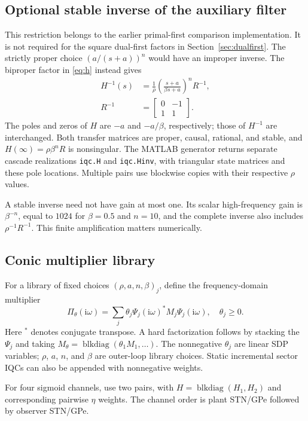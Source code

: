 \documentclass[final,5p,twocolumn]{elsarticle}
\theoremstyle{definition}
\theoremstyle{remark}
\DeclareMathOperator{\blkdiag}{blkdiag}
\begin{document}
\subsection{Optional stable inverse of the auxiliary filter}
This restriction belongs to the earlier primal-first comparison implementation. It is not required for the square dual-first factors in Section~\ref{sec:dualfirst}.
The strictly proper choice $(a/(s+a))^n$ would have an improper inverse. The biproper factor in \eqref{eq:h} instead gives
\begin{align}
 H^{-1}(s)&=\frac{1}{\rho}\left(\frac{s+a}{\beta s+a}\right)^nR^{-1},\label{eq:Hinv}\\
 R^{-1}&=\begin{bmatrix}0&-1\\1&1\end{bmatrix}.
\end{align}
The poles and zeros of $H$ are $-a$ and $-a/\beta$, respectively; those of $H^{-1}$ are interchanged. Both transfer matrices are proper, causal, rational, and stable, and $H(\infty)=\rho\beta^nR$ is nonsingular. The MATLAB generator returns separate cascade realizations \texttt{iqc.H} and \texttt{iqc.Hinv}, with triangular state matrices and these pole locations. Multiple pairs use blockwise copies with their respective $\rho$ values.

A stable inverse need not have gain at most one. Its scalar high-frequency gain is $\beta^{-n}$, equal to $1024$ for $\beta=0.5$ and $n=10$, and the complete inverse also includes $\rho^{-1}R^{-1}$. This finite amplification matters numerically.

\subsection{Conic multiplier library}
For a library of fixed choices $(\rho,a,n,\beta)_j$, define the frequency-domain multiplier
\begin{equation}\label{eq:conic}
 \Pi_\theta(\mathrm i\omega)=\sum_j\theta_j\Psi_j(\mathrm i\omega)^*M_j\Psi_j(\mathrm i\omega),\quad\theta_j\ge0.
\end{equation}
Here ${}^*$ denotes conjugate transpose. A hard factorization follows by stacking the $\Psi_j$ and taking $M_\theta=\blkdiag(\theta_1M_1,\ldots)$. The nonnegative $\theta_j$ are linear SDP variables; $\rho$, $a$, $n$, and $\beta$ are outer-loop library choices. Static incremental sector IQCs can also be appended with nonnegative weights.

For four sigmoid channels, use two pairs, with $H=\blkdiag(H_1,H_2)$ and corresponding pairwise $\eta$ weights. The channel order is plant STN/GPe followed by observer STN/GPe.
\end{document}
